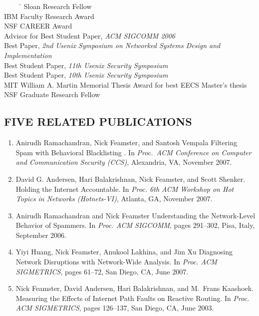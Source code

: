 \documentclass[11pt]{article}
\begin{document}
\begin{tabbing}
\ \ \ \ \ \= \kill
\> Sloan Research Fellow \\
\> IBM Faculty Research Award \\
\> NSF CAREER Award \\
\> Advisor for Best Student Paper, {\em ACM SIGCOMM 2006} \\
\> Best Paper, {\em 2nd Usenix Symposium on Networked Systems Design
  and Implementation} \\
\> Best Student Paper, {\em 11th Usenix Security Symposium} \\
\> Best Student Paper, {\em 10th Usenix Security Symposium} \\
\> MIT William A. Martin Memorial Thesis Award for best EECS Master's
thesis \\
\> NSF Graduate Research Fellow \\
\end{tabbing}



\subsection*{FIVE RELATED PUBLICATIONS} 

\begin{enumerate}

\item
Anirudh Ramachandran, Nick Feamster, and Santosh Vempala
{ Filtering Spam with Behavioral Blacklisting }.
In {\em {Proc.\ ACM Conference on Computer and Communication Security
(CCS)}}, Alexandria, {VA}, November 2007. 

\item 
David G. Andersen, Hari Balakrishnan, Nick Feamster, and Scott
Shenker. Holding the Internet Accountable. In {\em Proc. 6th ACM
  Workshop on Hot Topics in Networks (Hotnets-VI)}, Atlanta, GA,
November 2007.

\item
Anirudh Ramachandran and Nick Feamster
{Understanding the Network-Level Behavior of Spammers}.
In {\em {Proc. {ACM SIGCOMM}}}, pages 291--302, Pisa, Italy, September 2006.

\item
Yiyi Huang, Nick Feamster, Anukool Lakhina, and Jim Xu
{Diagnosing Network Disruptions with Network-Wide Analysis}.
In {\em {Proc. ACM SIGMETRICS}}, pages 61--72, San Diego, CA, June 2007.


\item
Nick Feamster, David Andersen, Hari Balakrishnan, and M.~Frans Kaashoek.
{Measuring the Effects of {I}nternet Path Faults on Reactive Routing}.
In {\em {Proc. ACM SIGMETRICS}}, pages 126--137, San Diego, CA, June 2003.


\end{enumerate}
\end{document}
